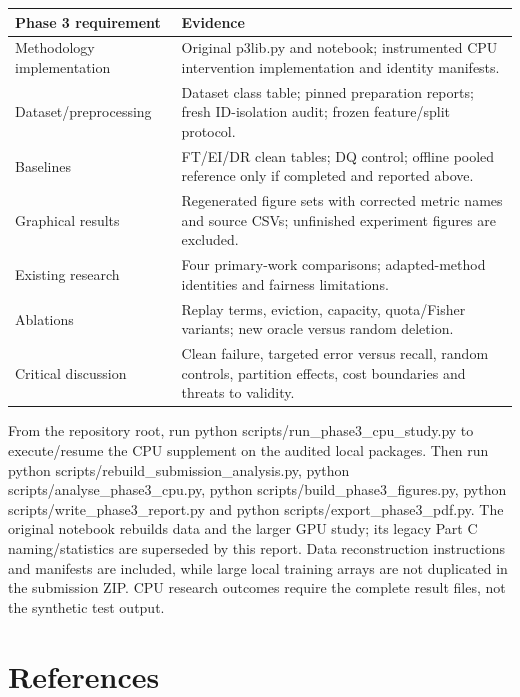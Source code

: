 \documentclass[
  10pt,
]{article}
\begin{document}
\begin{longtable}[]{@{}
  >{\raggedright\arraybackslash}p{}
  >{\raggedright\arraybackslash}p{}@{}}
\toprule
Phase 3 requirement & Evidence \\
\midrule
\endhead
Methodology implementation & Original p3lib.py and notebook;
instrumented CPU intervention implementation and identity manifests. \\
Dataset/preprocessing & Dataset class table; pinned preparation reports;
fresh ID-isolation audit; frozen feature/split protocol. \\
Baselines & FT/EI/DR clean tables; DQ control; offline pooled reference
only if completed and reported above. \\
Graphical results & Regenerated figure sets with corrected metric names
and source CSVs; unfinished experiment figures are excluded. \\
Existing research & Four primary-work comparisons; adapted-method
identities and fairness limitations. \\
Ablations & Replay terms, eviction, capacity, quota/Fisher variants; new
oracle versus random deletion. \\
Critical discussion & Clean failure, targeted error versus recall,
random controls, partition effects, cost boundaries and threats to
validity. \\
\bottomrule
\end{longtable}

From the repository root, run python scripts/run\_phase3\_cpu\_study.py
to execute/resume the CPU supplement on the audited local packages. Then
run python scripts/rebuild\_submission\_analysis.py, python
scripts/analyse\_phase3\_cpu.py, python
scripts/build\_phase3\_figures.py, python
scripts/write\_phase3\_report.py and python
scripts/export\_phase3\_pdf.py. The original notebook rebuilds data and
the larger GPU study; its legacy Part C naming/statistics are superseded
by this report. Data reconstruction instructions and manifests are
included, while large local training arrays are not duplicated in the
submission ZIP. CPU research outcomes require the complete result files,
not the synthetic test output.

\hypertarget{references}{%
\section{References}\label{references}}
\end{document}
